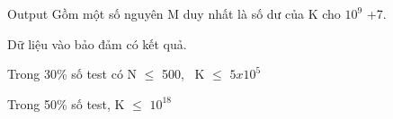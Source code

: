 Output
Gồm một số nguyên M duy nhất là số dư của K cho $10^{9}$ +7.


Dữ liệu vào bảo đảm có kết quả.


Trong 30\% số test có N  $\le$  500,  K  $\le$  $5x10^{5}$


Trong 50\% số test, K  $\le$  $10^{18}$